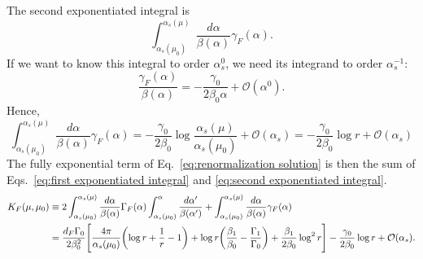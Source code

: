 \documentclass[11pt,twoside,reqno]{amsart}
\theoremstyle{plain}
\theoremstyle{remark}
\theoremstyle{definition}
\theoremstyle{remark}
\theoremstyle{definition}
\theoremstyle{definition}
\newcommand{\cO}{\mathcal{O}}
\begin{document}
	The second exponentiated integral is
	\begin{equation}
		\int_{\alpha_s(\mu_0)}^{\alpha_s(\mu)} \frac{d\alpha}{\beta(\alpha)}\gamma_F(\alpha).
	\end{equation}
	If we want to know this integral to order $\alpha_s^0$, we need its integrand to order $\alpha_s^{-1}$:
	\begin{equation}
		\frac{\gamma_F(\alpha)}{\beta(\alpha)} = -\frac{\gamma_0}{2\beta_0\alpha} + \cO(\alpha^0).
	\end{equation}
	Hence,
	\begin{equation}\label{eq:second exponentiated integral}
		\int_{\alpha_s(\mu_0)}^{\alpha_s(\mu)} \frac{d\alpha}{\beta(\alpha)}\gamma_F(\alpha) = -\frac{\gamma_0}{2\beta_0}\log\frac{\alpha_s(\mu)}{\alpha_s(\mu_0)} + \cO(\alpha_s) = -\frac{\gamma_0}{2\beta_0}\log r + \cO(\alpha_s)
	\end{equation}
	The fully exponential term of Eq.~\ref{eq:renormalization solution} is then the sum of Eqs.~\ref{eq:first exponentiated integral} and \ref{eq:second exponentiated integral}.
	\begin{equation}\label{eq:exponentiated kernel}
	\begin{aligned}
		K_F(\mu, \mu_0) &\equiv 2\int_{\alpha_s(\mu_0)}^{\alpha_s(\mu)} \frac{d\alpha}{\beta(\alpha)}\Gamma_F(\alpha)\int_{\alpha_s(\mu_0)}^\alpha \frac{d\alpha'}{\beta(\alpha')} + \int_{\alpha_s(\mu_0)}^{\alpha_s(\mu)} \frac{d\alpha}{\beta(\alpha)}\gamma_F(\alpha) \\
		&= \frac{d_F\Gamma_0}{2\beta_0^2}\Bigg[\frac{4\pi}{\alpha_s(\mu_0)}\qty(\log r + \frac{1}{r} - 1) + \log r \qty(\frac{\beta_1}{\beta_0} - \frac{\Gamma_1}{\Gamma_0}) + \frac{\beta_1}{2\beta_0}\log^2 r \Bigg] - \frac{\gamma_0}{2\beta_0}\log r + \cO(\alpha_s).
	\end{aligned}
	\end{equation}
\end{document}
